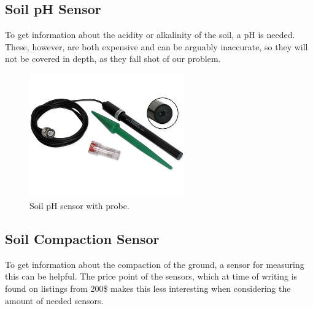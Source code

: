 \subsection{Soil pH Sensor} 
To get information about the acidity or alkalinity of the soil, a pH is needed. These, however, are both expensive and can be arguably inaccurate, so they will not be covered in depth, as they fall shot of our problem. 

\begin{figure}[H]
\centering
\includegraphics[width=0.6\textwidth]{chapters/analysis/figs/soilPhProbe.jpg}
\caption{Soil pH sensor with probe.}
\label{fig:phSensor}
\end{figure}

\subsection{Soil Compaction Sensor}
To get information about the compaction of the ground, a sensor for measuring this can be helpful. %
The price point of the sensors, which at time of writing is found on listings from 200\$ makes this less interesting when considering the amount of needed sensors. %

